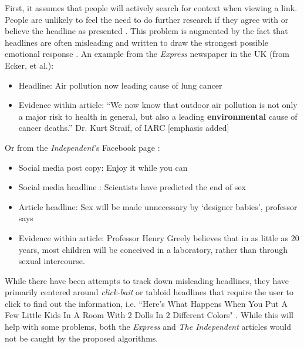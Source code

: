 \documentclass[preprint,review,12pt]{elsarticle}
\begin{document}
 First, it assumes that people will actively search for context when viewing a link. People are unlikely to feel the need to do further research if they agree with or believe the headline as presented \cite{nyhan2010corrections}. This problem is augmented by the fact that headlines are often misleading and written to draw the strongest possible emotional response \cite{chesney2017incongruent,ecker2014effects,bell1984good,molek2013towards,kilgo2018new,vettehen2008explaining}. An example from the \textit{Express} newspaper in the UK (from Ecker, et al.):
 \begin{itemize}
 \item Headline: Air pollution now leading cause of lung cancer
\item Evidence within article: “We now know that outdoor air pollution is not only a major risk to health in general, but also a leading \textbf{environmental} cause of cancer deaths.” Dr. Kurt Straif, of IARC [emphasis added]
 \end{itemize}
 
 Or from the \textit{Independent}'s Facebook page \cite{chesney2017incongruent}:
 \begin{itemize}
\item Social media post copy: Enjoy it while you
can
\item Social media headline \footnotemark[1]: Scientists have predicted the end of sex
\item Article headline\footnotemark[2]: Sex will be made unnecessary by ‘designer babies’, professor says
\item Evidence within article: Professor Henry Greely believes that in as little as 20 years, most children will be conceived in a laboratory, rather than through sexual intercourse.
 \end{itemize}
 
 While there have been attempts to track down misleading headlines, they have primarily centered around \textit{click-bait} or tabloid headlines \cite{chen2015misleading,chakraborty2016stop} that require the user to click to find out the information, i.e. ``Here’s What Happens When You Put A Few Little Kids In A Room With 2 Dolls In 2 Different Colors" \cite{chen2015misleading}. While this will help with some problems, both the \textit{Express} and \textit{The Independent} articles would not be caught by the proposed algorithms. 
 
\end{document}
